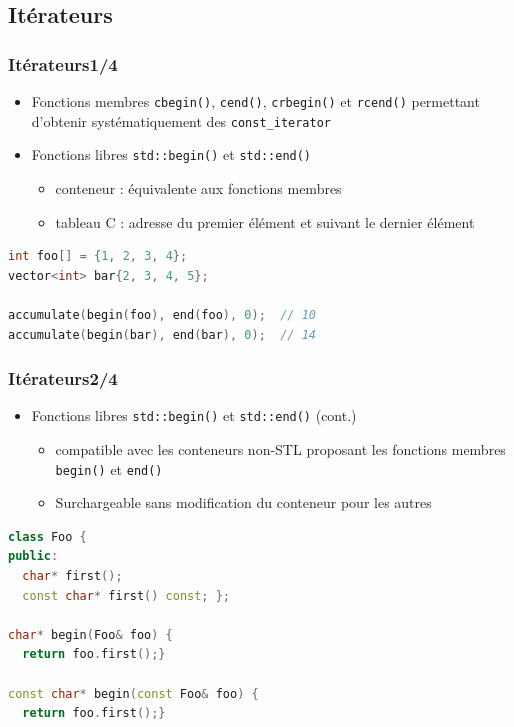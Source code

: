 \documentclass[C++.tex]{subfiles}
\begin{document}
\subsection*{Itérateurs}
\begin{frame}[fragile]
	\frametitle{Itérateurs\titlehfill{}1/4}
	\begin{itemize}
		\item Fonctions membres \lstinline|cbegin()|, \lstinline|cend()|, \lstinline|crbegin()| et \lstinline|rcend()| permettant d'obtenir systématiquement des \lstinline|const_iterator|


		\item Fonctions libres \lstinline|std::begin()| et \lstinline|std::end()|
		\begin{itemize}
			\item conteneur : équivalente aux fonctions membres
			\item tableau C : adresse du premier élément et suivant le dernier élément
		\end{itemize}
	\end{itemize}

	\begin{lstlisting}[language=C++]
int foo[] = {1, 2, 3, 4};
vector<int> bar{2, 3, 4, 5};

accumulate(begin(foo), end(foo), 0);  // 10
accumulate(begin(bar), end(bar), 0);  // 14\end{lstlisting}
\end{frame}

\begin{frame}[fragile]
	\frametitle{Itérateurs\titlehfill{}2/4}
	\begin{itemize}
		\item Fonctions libres \lstinline|std::begin()| et \lstinline|std::end()| (cont.)
		\begin{itemize}
			\item compatible avec les conteneurs non-STL proposant les fonctions membres \lstinline|begin()| et \lstinline|end()|
			\item Surchargeable sans modification du conteneur pour les autres

		\end{itemize}
	\end{itemize}

	\begin{lstlisting}[language=C++]
class Foo {
public:
  char* first();
  const char* first() const; };

char* begin(Foo& foo) {
  return foo.first();}

const char* begin(const Foo& foo) {
  return foo.first();}\end{lstlisting}
\end{frame}
\end{document}
